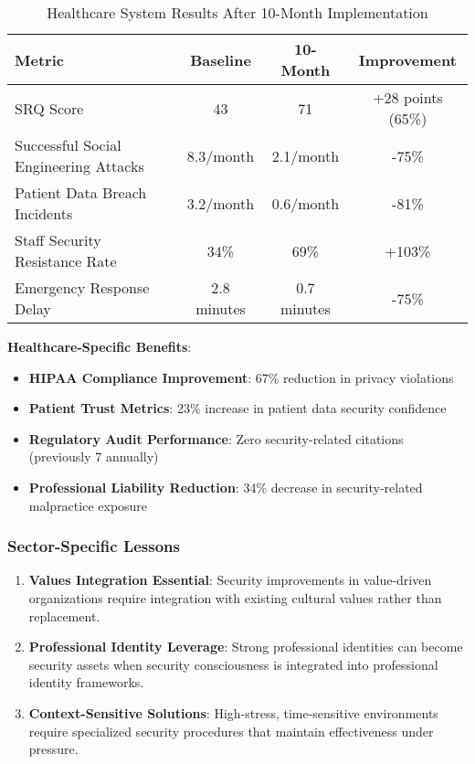 \documentclass[11pt,a4paper]{article}
\begin{document}
\begin{table}[H]
\centering
\caption{Healthcare System Results After 10-Month Implementation}
\begin{tabular}{lccc}
\toprule
Metric & Baseline & 10-Month & Improvement \\
\midrule
SRQ Score & 43 & 71 & +28 points (65\%) \\
Successful Social Engineering Attacks & 8.3/month & 2.1/month & -75\% \\
Patient Data Breach Incidents & 3.2/month & 0.6/month & -81\% \\
Staff Security Resistance Rate & 34\% & 69\% & +103\% \\
Emergency Response Delay & 2.8 minutes & 0.7 minutes & -75\% \\
\bottomrule
\end{tabular}
\end{table}

\textbf{Healthcare-Specific Benefits}:
\begin{itemize}
\item \textbf{HIPAA Compliance Improvement}: 67\% reduction in privacy violations
\item \textbf{Patient Trust Metrics}: 23\% increase in patient data security confidence
\item \textbf{Regulatory Audit Performance}: Zero security-related citations (previously 7 annually)
\item \textbf{Professional Liability Reduction}: 34\% decrease in security-related malpractice exposure
\end{itemize}

\subsubsection{Sector-Specific Lessons}

\begin{enumerate}
\item \textbf{Values Integration Essential}: Security improvements in value-driven organizations require integration with existing cultural values rather than replacement.

\item \textbf{Professional Identity Leverage}: Strong professional identities can become security assets when security consciousness is integrated into professional identity frameworks.

\item \textbf{Context-Sensitive Solutions}: High-stress, time-sensitive environments require specialized security procedures that maintain effectiveness under pressure.
\end{enumerate}
\end{document}

